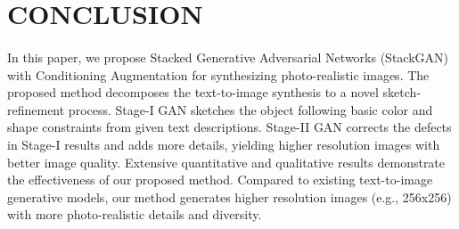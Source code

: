 \documentclass[a4paper,12pt,oneside]{article}
\begin{document}
\newpage
\section{CONCLUSION}
\paragraph{}
In this paper, we propose Stacked Generative Adversarial Networks (StackGAN) with Conditioning Augmentation for synthesizing photo-realistic images. The proposed method decomposes the text-to-image synthesis to a novel sketch-refinement process. Stage-I GAN sketches the object following basic color and shape constraints from given text descriptions. Stage-II GAN corrects the defects in Stage-I results and adds more details, yielding higher resolution images with better image quality. Extensive quantitative and qualitative results demonstrate the effectiveness of our proposed method. Compared to existing text-to-image generative models, our method generates higher resolution images (e.g., 256x256) with more photo-realistic details and diversity. 

\newpage
\end{document}
